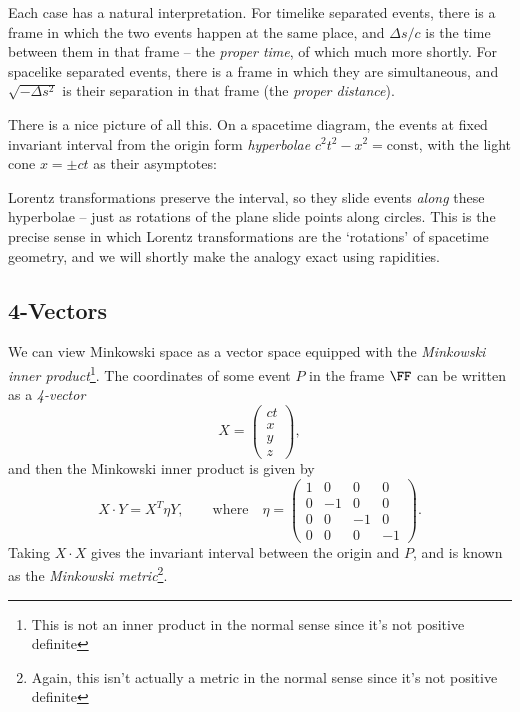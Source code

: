 Each case has a natural interpretation. For timelike separated events, there is a frame in which the two events happen at the same place, and $\Delta s/c$ is the time between them in that frame -- the \emph{proper time}, of which much more shortly. For spacelike separated events, there is a frame in which they are simultaneous, and $\sqrt{-\Delta s^2}$ is their separation in that frame (the \emph{proper distance}).

There is a nice picture of all this. On a spacetime diagram, the events at fixed invariant interval from the origin form \emph{hyperbolae} $c^2t^2 - x^2 = \text{const}$, with the light cone $x = \pm ct$ as their asymptotes:
\begin{center}
\end{center}
Lorentz transformations preserve the interval, so they slide events \emph{along} these hyperbolae -- just as rotations of the plane slide points along circles. This is the precise sense in which Lorentz transformations are the `rotations' of spacetime geometry, and we will shortly make the analogy exact using rapidities.

\subsection{4-Vectors}

We can view Minkowski space as a vector space equipped with the \emph{Minkowski inner product}\footnote{This is not an inner product in the normal sense since it's not positive definite}. The coordinates of some event $P$ in the frame $\FF$ can be written as a \emph{4-vector}
$$	
X= \begin{pmatrix}
	ct \\ x \\ y \\ z
\end{pmatrix},
$$
and then the Minkowski inner product is given by
$$
X \cdot Y = X^T \eta Y, \quad \quad \text{where} \quad \eta = \begin{pmatrix}
	1 & 0 & 0 & 0 \\
	0 & -1 & 0 & 0 \\
	0 & 0 & -1 & 0 \\
	0 & 0 & 0 & -1
\end{pmatrix}.
$$
Taking $X \cdot X$ gives the invariant interval between the origin and $P$, and is known as the \emph{Minkowski metric}\footnote{Again, this isn't actually a metric in the normal sense since it's not positive definite}.

